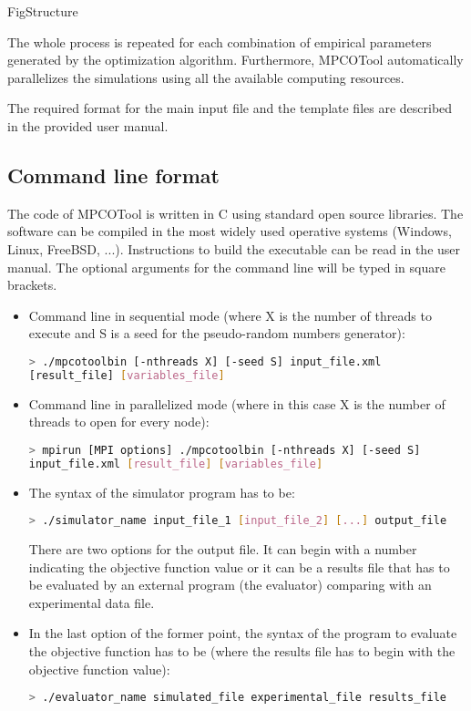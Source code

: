 \documentclass[review,authoryear]{elsarticle}
\begin{document}
{FigStructure}

The whole process is repeated for each combination of empirical parameters generated by the optimization algorithm. Furthermore, MPCOTool automatically parallelizes the simulations using all the available computing resources.

The required format for the main input file and the template files are described in the provided user manual.

\subsection{Command line format}

The code of MPCOTool is written in C using standard open source libraries. The software can be compiled in the most widely used operative systems (Windows, Linux, FreeBSD, ...). Instructions to build the executable can be read in the user manual. The optional arguments for the command line will be typed in square brackets.

\begin{itemize}

\item Command line in sequential mode (where X is the number of threads to
execute and S is a seed for the pseudo-random numbers generator):
\begin{lstlisting}[language=bash,basicstyle=\scriptsize]
> ./mpcotoolbin [-nthreads X] [-seed S] input_file.xml
[result_file] [variables_file]
\end{lstlisting}

\item Command line in parallelized mode (where in this case X is the number of
threads to open for every node):
\begin{lstlisting}[language=bash,basicstyle=\scriptsize]
> mpirun [MPI options] ./mpcotoolbin [-nthreads X] [-seed S]
input_file.xml [result_file] [variables_file]
\end{lstlisting}

\item The syntax of the simulator program has to be:
\begin{lstlisting}[language=bash,basicstyle=\scriptsize]
> ./simulator_name input_file_1 [input_file_2] [...] output_file
\end{lstlisting}
There are two options for the output file. It can begin with a number indicating
the objective function value or it can be a results file that has to be
evaluated by an external program (the evaluator) comparing with an experimental
data file.

\item In the last option of the former point, the syntax of the program to
evaluate the objective function has to be (where the results file has to begin
with the objective function value):
\begin{lstlisting}[language=bash,basicstyle=\scriptsize]
> ./evaluator_name simulated_file experimental_file results_file
\end{lstlisting}

\end{itemize}
\end{document}

